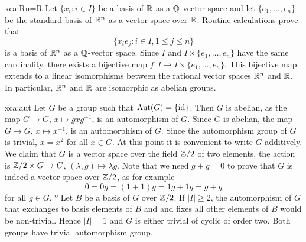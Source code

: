 \begin{sol}{xca:Rn=R}
    Let $\{x_i:i\in I\}$ be a basis of $\mathbb{R}$ as a $\mathbb{Q}$-vector space and
    let $\{e_1,\dots,e_n\}$ be the standard basis of $\mathbb{R}^n$ as a vector space over $\mathbb{R}$. 
    Routine calculations prove that  
    \[
    \{x_ie_j:i\in I,1\leq j\leq n\}
    \]
    is a basis of $\mathbb{R}^n$ as a $\mathbb{Q}$-vector space. 
    Since
    $I$ and $I\times\{e_1,\dots,e_n\}$ have the same cardinality, 
    there exists a bijective map $f\colon I\to I\times\{e_1,\dots,e_n\}$. This bijective
    map extends to a linear isomorphisms between the rational vector spaces 
    $\mathbb{R}^n$ and
    $\mathbb{R}$. In particular, $\mathbb{R}^n$ and 
    $\mathbb{R}$ are isomorphic as abelian groups. 
\end{sol}










\begin{sol}{xca:aut}
    Let $G$ be a group such that $\operatorname{Aut}(G)=\{\operatorname{id}\}$. 
    Then $G$ is abelian, as the map $G\to G$, $x\mapsto gxg^{-1}$,   
    is an automorphism of $G$. Since $G$ is abelian, 
    the map $G\to G$, $x\mapsto x^{-1}$, is an automorphism of $G$. Since 
    the automorphism group of $G$ is trivial, 
    $x=x^2$ for all $x\in G$. 
    At this point it is convenient to write $G$ additively. We claim that 
    $G$ is a vector space
    over the field $\mathbb{Z}/2$ of two elements, the action
    is $\mathbb{Z}/2\times G\to G$, $(\lambda,g)\mapsto \lambda g$. Note that
    we need $g+g=0$ to prove that $G$ is indeed a vector space over $\mathbb{Z}/2$, as for example
    \[
    0=0g=(1+1)g=1g+1g=g+g
    \]
    for all $g\in G$. º
    Let $B$ be   
    a basis of $G$ over $\mathbb{Z}/2$. If $|I|\geq 2$, 
    the automorphism of $G$ that exchanges to basis elements of $B$ and  
    and fixes all other elements of $B$ would be non-trivial. Hence $|I|=1$ and 
    $G$ is either trivial of cyclic of order two. Both groups have trivial
    automorphism group. 
\end{sol}


